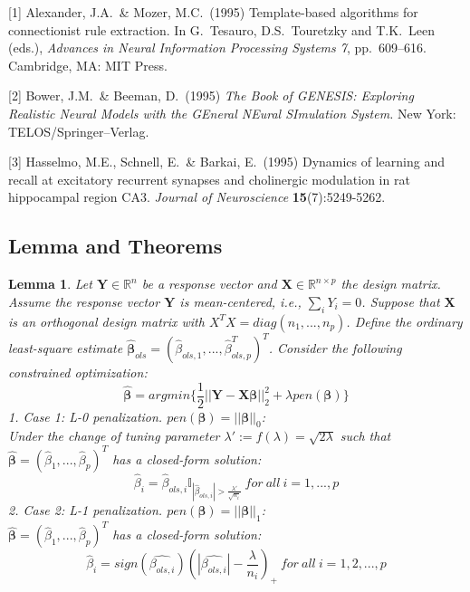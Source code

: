 \documentclass{article}
\newtheorem{lemma}{Lemma}
\begin{document}
\small

[1] Alexander, J.A.\ \& Mozer, M.C.\ (1995) Template-based algorithms for
connectionist rule extraction. In G.\ Tesauro, D.S.\ Touretzky and T.K.\ Leen
(eds.), {\it Advances in Neural Information Processing Systems 7},
pp.\ 609--616. Cambridge, MA: MIT Press.

[2] Bower, J.M.\ \& Beeman, D.\ (1995) {\it The Book of GENESIS: Exploring
  Realistic Neural Models with the GEneral NEural SImulation System.}  New York:
TELOS/Springer--Verlag.

[3] Hasselmo, M.E., Schnell, E.\ \& Barkai, E.\ (1995) Dynamics of learning and
recall at excitatory recurrent synapses and cholinergic modulation in rat
hippocampal region CA3. {\it Journal of Neuroscience} {\bf 15}(7):5249-5262.

\begin{appendices}
	\section{Lemma and Theorems}
	\begin{lemma}
		Let $\mathbf{Y} \in \mathbb{R}^n$ be a response vector and $\mathbf{X} \in \mathbb{R}^{n\times p}$ the design matrix. Assume the response vector $\mathbf{Y}$ is mean-centered, i.e., $\sum_iY_i=0$. Suppose that $\mathbf{X}$ is an orthogonal design matrix with $X^TX=diag(n_1,...,n_p)$. Define the ordinary least-square estimate $\hat{\bm{\beta}}_{ols} = (\hat{\beta}_{ols,1},...,\hat{\beta}^T_{ols,p})^T$. Consider the following constrained optimization: 
		\begin{equation*}
		\bm{
			\hat{\beta}} = argmin\{\frac{1}{2}||\mathbf{Y}-\mathbf{X}\bm{\beta}||^2_2+\lambda pen(\bm{\beta})\}
		\end{equation*}
		1. Case 1: L-0 penalization. $pen(\bm{\beta}) = ||\bm{\beta}||_0$:\\
		Under the change of tuning parameter $\lambda' := f(\lambda)=\sqrt{2\lambda}$  such that $\bm{\hat{\beta}} = (\hat{\beta}_1,..., \hat{\beta}_p)^T$ has a closed-form solution:
		\begin{equation*}
		\hat{\beta}_i = \hat{\beta}_{ols,i}\mathbb{I}_{|\hat{\beta}_{ols,i}|>\frac{\lambda'}{\sqrt{n_i}}}\ for\ all\ i=1,...,p
		\end{equation*}
		2. Case 2: L-1 penalization. $pen(\bm{\beta})= ||\bm{\beta}||_1$:\\
		$\bm{\hat{\beta}} = (\hat{\beta}_1,..., \hat{\beta}_p)^T$ has a closed-form solution:
		\begin{equation*}
		\hat{\beta}_i = sign(\hat{\beta_{ols,i}})(|\hat{\beta_{ols,i}}|-\frac{\lambda}{n_i})_+\ for\ all\ i=1,2,...,p
		\end{equation*}
		

\end{lemma}
\end{appendices}
\end{document}
